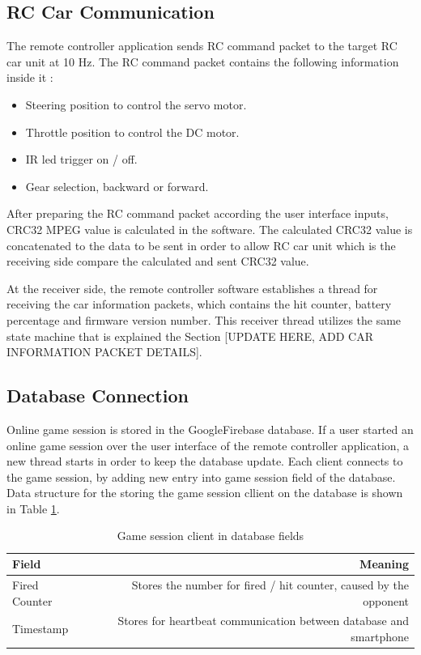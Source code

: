 \subsection{RC Car Communication} \label{sec_rc_comm}
The remote controller application sends RC command packet to the target RC car unit at 10 Hz. The RC command packet contains the following information inside it :

\begin{itemize}
    \item Steering position to control the servo motor.
    \item Throttle position to control the DC motor.
    \item IR led trigger on / off.
    \item Gear selection, backward or forward.
\end{itemize}

After preparing the RC command packet according the user interface inputs, CRC32 MPEG value is calculated in the software. The calculated CRC32 value is concatenated to the data to be sent in order to allow RC car unit which is the receiving side compare the calculated and sent CRC32 value.

At the receiver side, the remote controller software establishes a thread for receiving the car information packets, which contains the hit counter, battery percentage and firmware version number. This receiver thread utilizes the same state machine that is explained the Section [UPDATE HERE, ADD CAR INFORMATION PACKET DETAILS]. 


\subsection{Database Connection} \label{sec_db_connection}
Online game session is stored in the Google\texttrademark\;Firebase database. If a user started an online game session over the user interface of the remote controller application, a new thread starts in order to keep the database update. Each client connects to the game session, by adding new entry into game session field of  the database. Data structure for the storing the game session cllient on the database is shown in Table \ref{tab:db_fields}.

\begin{table}[!htbp]
    \centering
    \caption{\label{tab:db_fields}Game session client in database fields}
    \begin{tabular}{l|r}
        Field & Meaning \\\hline
        Fired Counter & Stores the number for fired / hit counter, caused by the opponent \\
        Timestamp & Stores for heartbeat communication between database and smartphone \\
    \end{tabular}
\end{table}

